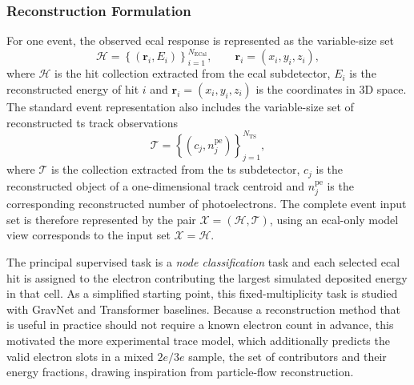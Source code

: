 \subsubsection{Reconstruction Formulation}
\label{sec:reconstr_formulation}

For one event, the observed \gls{ecal} response is represented as the
variable-size set
\begin{equation}
    \mathcal{H} =
    \left\{
    \left(\boldsymbol{r}_i,E_i\right)
    \right\}_{i=1}^{N_{\mathrm{ECal}}},
    \qquad
    \boldsymbol{r}_i=(x_i,y_i,z_i),
\end{equation}
where $\mathcal{H}$ is the hit collection extracted from the \gls{ecal} subdetector, \(E_i\) is the reconstructed energy of hit \(i\) and $\boldsymbol{r}_i=(x_i,y_i,z_i)$ is the coordinates in 3D space. The standard event
representation also includes the variable-size set of
reconstructed \gls{ts} track observations
\begin{equation}
    \mathcal{T} =
    \left\{
    \left(c_j,n^{\mathrm{pe}}_j\right)
    \right\}_{j=1}^{N_{\mathrm{TS}}},
\end{equation}
where $\mathcal{T}$ is the collection extracted from the \gls{ts} subdetector, \(c_j\) is the reconstructed object of a one-dimensional track centroid and
\(n^{\mathrm{pe}}_j\) is the corresponding reconstructed number of
photoelectrons. The complete event input set is therefore represented by the pair
\(\mathcal{X}=(\mathcal{H},\mathcal{T})\), using an \gls{ecal}-only model view corresponds to the input set \(\mathcal{X}=\mathcal{H}\). 


The principal supervised task is a \textit{node classification} task \cite{duarte2020-gnn-tracking} and each selected \gls{ecal} hit is assigned to the
electron contributing the largest simulated deposited energy in that cell.
As a simplified starting point, this fixed-multiplicity task is studied with GravNet and Transformer baselines.
Because a reconstruction method that is useful in practice should not require a known electron
count in advance, this motivated the more experimental \gls{trace} model, which
additionally predicts the valid electron slots in a mixed \(2e/3e\) sample,
the set of contributors and their energy fractions, drawing inspiration from
particle-flow reconstruction.

